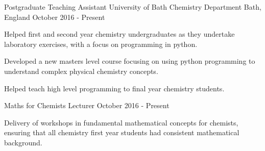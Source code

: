 \begin{cventries}
    \cventry
    {Postgraduate Teaching Assistant}
	  {University of Bath Chemistry Department}    
    {Bath, England}
    {October 2016 - Present}
    {
      \begin{cvitems}
        \item{Helped first and second year chemistry undergraduates as they undertake laboratory exercises, with a focus on programming in python.}
        \item{Developed a new masters level course focusing on using python programming to understand complex physical chemistry concepts.}
        \item{Helped teach high level programming to final year chemistry students.}
      \end{cvitems}
    }

	\cventry   
    {Maths for Chemists Lecturer}
    {}
    {}
    {October 2016 - Present}
    {
      \begin{cvitems}
        \item
        {Delivery of workshops in fundamental mathematical concepts for chemists, ensuring that all chemistry first year students had consistent
mathematical background.} 
      \end{cvitems}
    }
\end{cventries}